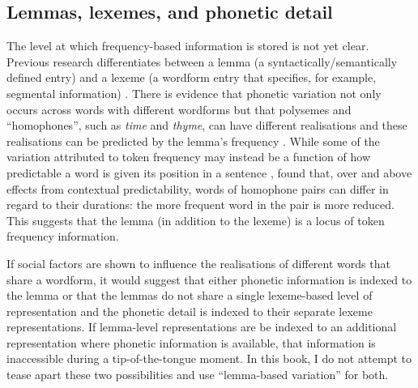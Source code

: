 

	\subsection{Lemmas, lexemes, and phonetic detail}
	
The level at which frequency-based information is stored is not yet clear.  Previous research differentiates between a lemma (a syntactically/semantically defined entry) and a lexeme (a wordform entry that specifies, for example, segmental information) \cite{bock1995}.  There is evidence that phonetic variation not only occurs across words with different wordforms but that polysemes and ``homophones'', such as \textit{time} and \textit{thyme}, can have different realisations and these realisations can be predicted by the lemma's frequency \cite{gahl-thyme,jurafskyetal2002}.  While some of the variation attributed to token frequency may instead be a function of how predictable a word is given its position in a sentence \cite{jurafskyetal2002},  found that, over and above effects from contextual predictability, words of homophone pairs can differ in regard to their durations: the more frequent word in the pair is more reduced.  This suggests that the lemma (in addition to the lexeme) is a locus of token frequency information. 

If social factors are shown to influence the realisations of different words that share a wordform, it would suggest that either phonetic information is indexed to the lemma or that the lemmas do not share a single lexeme-based level of representation and the phonetic detail is indexed to their separate lexeme representations.  If lemma-level representations are be indexed to an additional representation where phonetic information is available, that information is inaccessible during a tip-of-the-tongue moment. \nocite{johnson1997}\nocite{pierrehumbert2001}\nocite{pierrehumbert2006}  In this book, I do not attempt to tease apart these two possibilities and use ``lemma-based variation'' for both.

							

